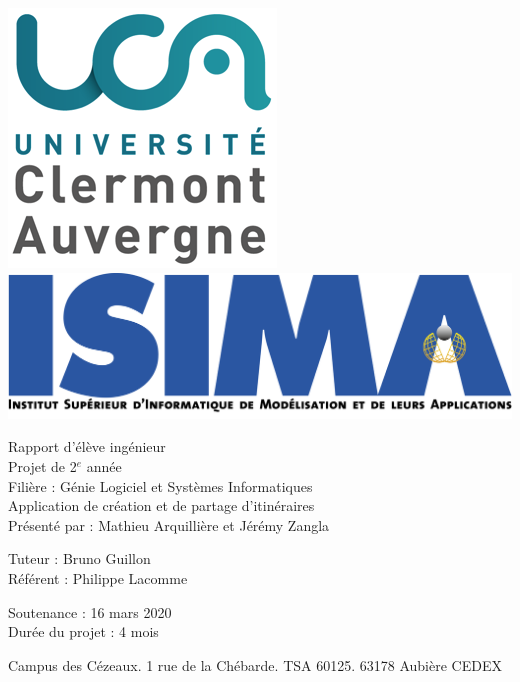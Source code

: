 \begin{titlepage}
\includegraphics[scale=0.3]{images/Logo-UCA.png}
\hfill
\includegraphics[scale=0.3]{images/isima-logo.png}

  \begin{center}
    \begin{minipage}{15cm}
      \begin{center}
        Rapport d'élève ingénieur\\
        Projet de 2$^{e}$ année\\
        Filière : Génie Logiciel et Systèmes Informatiques\\
        \vspace{10pt}
        \LARGE Application de création et de partage d'itinéraires\\
        \vspace{30pt}
        \large Présenté par : Mathieu Arquillière et Jérémy Zangla
      \end{center}
    \end{minipage}
  \end{center}

\begin{minipage}{0.4\textwidth}
\begin{flushleft}
  Tuteur : Bruno Guillon\\
  Référent : Philippe Lacomme
\end{flushleft}
\end{minipage}
\hfill
\begin{minipage}{0.4\textwidth}
\begin{flushright}
  Soutenance : 16 mars 2020\\
  Durée du projet : 4 mois
\end{flushright}
\end{minipage}

\begin{center}
Campus des Cézeaux. 1 rue de la Chébarde. TSA 60125. 63178 Aubière CEDEX
\end{center}

\end{titlepage}